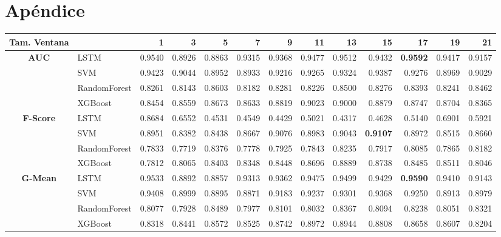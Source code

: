 \chapter{Apéndice}
\appendix
\begin{table}[h]
	\begin{adjustbox}{max width=15cm}
		\centering
		\begin{tabular}{|c|l|r|r|r|r|r|r|r|r|r|r|r|}
			\hline
			\textbf{Tam. Ventana}
			&         &      1  &      3  &      5  &      7  &      9  &      11 &      13 &      15 &      17 &      19 &      21 \\
			\hline
			\textbf{AUC} & LSTM &  0.9540 &  0.8926 &  0.8863 &  0.9315 &  0.9368 &  0.9477 &  0.9512 &  0.9432 &  \textbf{0.9592} &  0.9417 &  0.9157 \\
			& SVM &  0.9423 &  0.9044 &  0.8952 &  0.8933 &  0.9216 &  0.9265 &  0.9324 &  0.9387 &  0.9276 &  0.8969 &  0.9029 \\
			& RandomForest &  0.8261 &  0.8143 &  0.8603 &  0.8182 &  0.8281 &  0.8226 &  0.8500 &  0.8276 &  0.8393 &  0.8241 &  0.8462 \\
			& XGBoost &  0.8454 &  0.8559 &  0.8673 &  0.8633 &  0.8819 &  0.9023 &  0.9000 &  0.8879 &  0.8747 &  0.8704 &  0.8365 \\
			\hline
			\textbf{F-Score} & LSTM &  0.8684 &  0.6552 &  0.4531 &  0.4549 &  0.4429 &  0.5021 &  0.4317 &  0.4628 &  0.5140 &  0.6901 &  0.5921 \\
			& SVM &  0.8951 &  0.8382 &  0.8438 &  0.8667 &  0.9076 &  0.8983 &  0.9043 &  \textbf{0.9107} &  0.8972 &  0.8515 &  0.8660 \\
			& RandomForest &  0.7833 &  0.7719 &  0.8376 &  0.7778 &  0.7925 &  0.7843 &  0.8235 &  0.7917 &  0.8085 &  0.7865 &  0.8182 \\
			& XGBoost &  0.7812 &  0.8065 &  0.8403 &  0.8348 &  0.8448 &  0.8696 &  0.8889 &  0.8738 &  0.8485 &  0.8511 &  0.8046 \\
			\hline
			\textbf{G-Mean} & LSTM &  0.9533 &  0.8892 &  0.8857 &  0.9313 &  0.9362 &  0.9475 &  0.9499 &  0.9429 &  \textbf{0.9590} &  0.9410 &  0.9143 \\
			& SVM &  0.9408 &  0.8999 &  0.8895 &  0.8871 &  0.9183 &  0.9237 &  0.9301 &  0.9368 &  0.9250 &  0.8913 &  0.8979 \\
			& RandomForest &  0.8077 &  0.7928 &  0.8489 &  0.7977 &  0.8101 &  0.8032 &  0.8367 &  0.8094 &  0.8238 &  0.8051 &  0.8321 \\
			& XGBoost &  0.8318 &  0.8441 &  0.8572 &  0.8525 &  0.8742 &  0.8972 &  0.8944 &  0.8808 &  0.8658 &  0.8607 &  0.8204 \\

\end{tabular}
\end{adjustbox}
\end{table}
